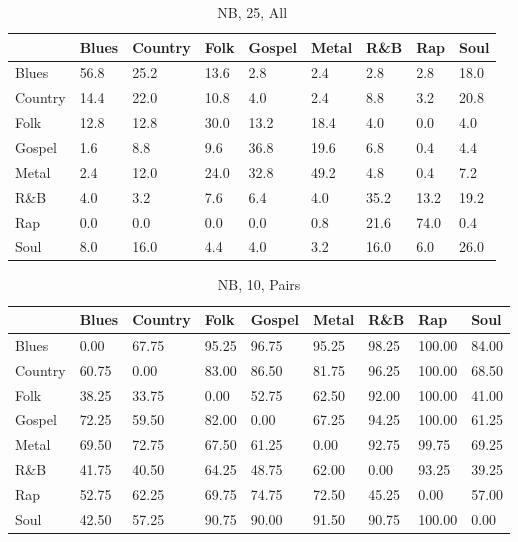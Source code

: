 \documentclass[a4paper,oneside]{article}
\begin{document}
\begin{table}[H]\centering
\caption{NB, 25, All}
\begin{tabu}{l|*{8}{l}}
&Blues & Country & Folk & Gospel & Metal & R\&B & Rap & Soul \\ \hline
Blues & 56.8 & 25.2 & 13.6 & 2.8 & 2.4 & 2.8 & 2.8 & 18.0 \\
Country & 14.4 & 22.0 & 10.8 & 4.0 & 2.4 & 8.8 & 3.2 & 20.8 \\
Folk & 12.8 & 12.8 & 30.0 & 13.2 & 18.4 & 4.0 & 0.0 & 4.0 \\
Gospel & 1.6 & 8.8 & 9.6 & 36.8 & 19.6 & 6.8 & 0.4 & 4.4 \\
Metal & 2.4 & 12.0 & 24.0 & 32.8 & 49.2 & 4.8 & 0.4 & 7.2 \\
R\&B & 4.0 & 3.2 & 7.6 & 6.4 & 4.0 & 35.2 & 13.2 & 19.2 \\
Rap & 0.0 & 0.0 & 0.0 & 0.0 & 0.8 & 21.6 & 74.0 & 0.4 \\
Soul & 8.0 & 16.0 & 4.4 & 4.0 & 3.2 & 16.0 & 6.0 & 26.0 \\
\end{tabu}
\end{table}

\begin{table}[H]\centering
\caption{NB, 10, Pairs}
\begin{tabu}{l|*{8}{l}}
 & Blues & Country & Folk & Gospel & Metal & R\&B & Rap & Soul \\ \hline
Blues & 0.00 & 67.75 & 95.25 & 96.75 & 95.25 & 98.25 & 100.00 & 84.00 \\
Country & 60.75 & 0.00 & 83.00 & 86.50 & 81.75 & 96.25 & 100.00 & 68.50 \\
Folk & 38.25 & 33.75 & 0.00 & 52.75 & 62.50 & 92.00 & 100.00 & 41.00 \\
Gospel & 72.25 & 59.50 & 82.00 & 0.00 & 67.25 & 94.25 & 100.00 & 61.25 \\
Metal & 69.50 & 72.75 & 67.50 & 61.25 & 0.00 & 92.75 & 99.75 & 69.25 \\
R\&B & 41.75 & 40.50 & 64.25 & 48.75 & 62.00 & 0.00 & 93.25 & 39.25 \\
Rap & 52.75 & 62.25 & 69.75 & 74.75 & 72.50 & 45.25 & 0.00 & 57.00 \\
Soul & 42.50 & 57.25 & 90.75 & 90.00 & 91.50 & 90.75 & 100.00 & 0.00 \\
\end{tabu}
\end{table}
\end{document}
